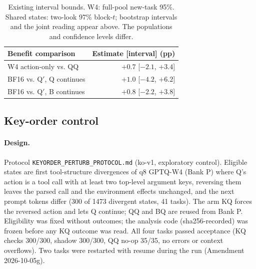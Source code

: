 \begin{table}[ht]
\centering\small
\setlength{\tabcolsep}{4pt}\renewcommand{\arraystretch}{1.12} %
\begin{tabular*}{\columnwidth}{@{\extracolsep{\fill}}lr@{}}
\toprule
Benefit comparison & Estimate [interval] (pp) \\
\midrule
W4 action-only vs. QQ & $+0.7$ [$-2.1$, $+3.4$] \\
BF16 vs. Q$'$, Q continues & $+1.0$ [$-4.2$, $+6.2$] \\
BF16 vs. Q$'$, B continues & $+0.8$ [$-2.2$, $+3.8$] \\
\bottomrule
\end{tabular*}
\caption{Existing interval bounds. W4: full-pool new-task 95\%. Shared states: two-look 97\% block-$t$; bootstrap intervals and the joint reading appear above. The populations and confidence levels differ.}
\label{tab:resolution}
\end{table}

\subsection{Key-order control}
\label{app:keyorder}

\paragraph{Design.} Protocol \texttt{KEYORDER\_PERTURB\_PROTOCOL.md} (ko-v1, exploratory control). Eligible states are first tool-structure divergences of q8 GPTQ-W4 (Bank P) where Q's action is a tool call with at least two top-level argument keys, reversing them leaves the parsed call and the environment effects unchanged, and the next prompt tokens differ (300 of 1473 divergent states, 41 tasks). The arm KQ forces the reversed action and lets Q continue; QQ and BQ are reused from Bank P. Eligibility was fixed without outcomes; the analysis code (sha256-recorded) was frozen before any KQ outcome was read. All four tasks passed acceptance (KQ checks 300/300, shadow 300/300, QQ no-op 35/35, no errors or context overflows). Two tasks were restarted with resume during the run (Amendment 2026-10-05g). %
